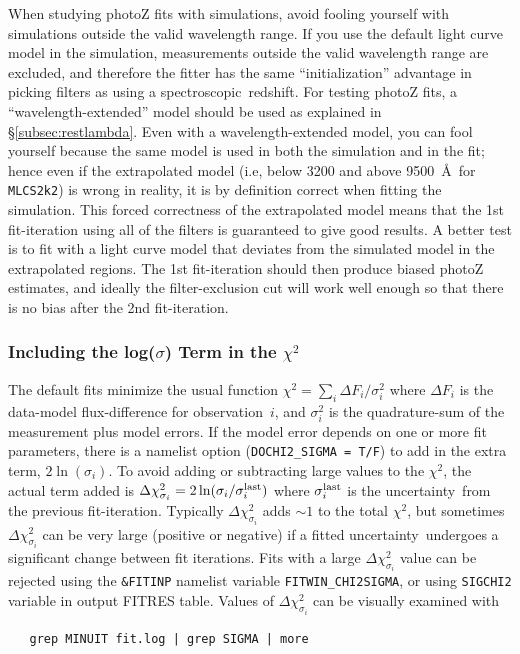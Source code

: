 \documentclass[12pt]{article}
\newcommand{\unc}{uncertainty}
\newcommand{\mlcs}{{\tt MLCS2k2}}
\newcommand{\spec}{spectroscopic}
\newcommand{\obs}{observation}
\begin{document}
When studying photoZ fits with simulations, 
avoid fooling yourself with simulations outside 
the valid wavelength range.
If you use the default light curve model in the simulation,
measurements outside the valid wavelength range
are excluded, and therefore the fitter has the same
``initialization'' advantage in picking filters 
as using a \spec\ redshift.  For testing photoZ fits,
a ``wavelength-extended'' model should be used
as explained in \S\ref{subsec:restlambda}.
Even with a wavelength-extended model, you can fool yourself
because the same model is used in both the simulation 
and in the fit; hence even if the extrapolated
model (i.e, below 3200 and above 9500~\AA\ for {\mlcs}) 
is wrong in reality, it is by definition correct when
fitting the simulation. This forced correctness of the
extrapolated model means that the 1st fit-iteration
using all of the filters is guaranteed to give
good results.  A better test is to fit with a light curve model
that deviates from the simulated model in the extrapolated
regions. The 1st fit-iteration should then produce
biased photoZ estimates, and ideally the filter-exclusion
cut will work well enough so that there is no bias
after the 2nd fit-iteration.

   \subsubsection{Including the log($\sigma$) Term in the $\chi^2$ }
   \label{sss:chi2sigma}

\newcommand{\SIGLAST}{\sigma_i^{\rm last}}
\newcommand{\SIGCHISQ}{\Delta\chi^2_{\sigma_i}}


The default fits minimize the usual function
$\chi^2 = \sum_i \Delta F_i/\sigma_i^2$ where
$\Delta F_i$ is the data-model flux-difference
for \obs\ $i$, and $\sigma_i^2$ is the quadrature-sum
of the measurement plus model errors.  If the model
error depends on one or more fit parameters,
there is a namelist option ({\tt DOCHI2\_SIGMA = T/F})
to add in the extra term, $2\ln(\sigma_i)$.
To avoid adding or subtracting large values to the 
$\chi^2$, the actual term added is 
$\SIGCHISQ = 2\ln(\sigma_i/{\SIGLAST})$ where $\SIGLAST$
is the \unc\ from the previous fit-iteration.
Typically $\SIGCHISQ$ adds $\sim 1$ to the total $\chi^2$,
but sometimes $\SIGCHISQ$ can be very large 
(positive or negative) if a fitted \unc\ undergoes
a significant change between fit iterations.
Fits with a large $\SIGCHISQ$ value can be rejected
using the {\tt \&FITINP} namelist variable {\tt FITWIN\_CHI2SIGMA},
or using {\tt SIGCHI2} variable in output FITRES table.
Values of $\SIGCHISQ$ can be visually examined with
%
\begin{verbatim}
   grep MINUIT fit.log | grep SIGMA | more
\end{verbatim}
\end{document}
